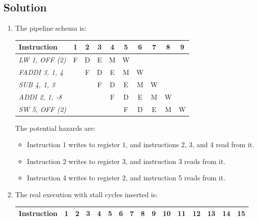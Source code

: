 \subsection*{Solution}
\begin{enumerate}
    \item The pipeline schema is:
        \begin{table}[H]
            \centering
            \begin{tabular}{l|ccccccccc}
            \textbf{Instruction}        & \textbf{1} & \textbf{2} & \textbf{3} & \textbf{4} & \textbf{5} & \textbf{6} & \textbf{7} & \textbf{8} & \textbf{9}  \\ \hline
            \textit{LW 1, OFF (2)}  & F          & D          & E          & M          & W          &            &            &            &            \\
            \textit{FADDI 3, 1, 4}   &            & F          & D          & E          & M          & W          &            &            &            \\
            \textit{SUB 4, 1, 3}  &            &            & F          & D          & E          & M          & W          &            &            \\
            \textit{ADDI 2, 1, -8}  &            &            &            & F          & D          & E          & M          & W          &            \\
            \textit{SW 5, OFF (2)}  &            &            &            &            & F          & D          & E          & M          & W         
            \end{tabular}
        \end{table}
        The potential hazards are:
        \begin{itemize}
            \item Instruction 1 writes to register $1$, and instructions 2, 3, and 4 read from it.
            \item Instruction 2 writes to register $3$, and instruction 3 reads from it.
            \item Instruction 4 writes to register $2$, and instruction 5 reads from it.
        \end{itemize}
    \item The real execution with stall cycles inserted is:
        \begin{table}[H]
            \centering
            \begin{tabular}{l|ccccccccccccccc}
            \textbf{Instruction}        & \textbf{1} & \textbf{2} & \textbf{3} & \textbf{4} & \textbf{5} & \textbf{6} & \textbf{7} & \textbf{8} & \textbf{9} & \textbf{10} & \textbf{11} & \textbf{12} & \textbf{13} & \textbf{14} & \textbf{15} \\ \hline

\end{tabular}
\end{table}
\end{enumerate}
